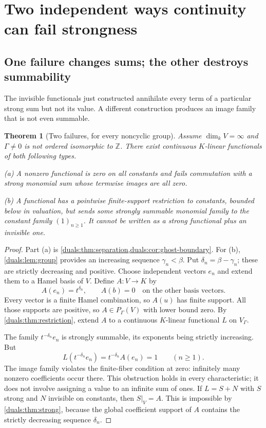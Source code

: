 \documentclass[11pt,letterpaper]{article}
\numberwithin{equation}{section}
\newtheorem{theorem}{Theorem}[section]
\theoremstyle{definition}
\theoremstyle{remark}
\newcommand{\Z}{\mathbb Z}
\begin{document}
\section{Two independent ways continuity can fail strongness}
\label{duals:sec:twofailures}

\subsection{One failure changes sums; the other destroys summability}
The invisible functionals just constructed annihilate every term of a
particular strong sum but not its value. A different construction
produces an image family that is not even summable.

\begin{theorem}[Two failures, for every noncyclic group]
\label{duals:thm:twofailures}
Assume $\dim_kV=\infty$ and $\Gamma\ne0$ is not ordered isomorphic
to $\Z$.
There exist continuous $K$-linear functionals of both following types.

\textup{(a)} A nonzero functional is zero on all constants and fails
commutation with a strong monomial sum whose termwise images are all
zero.

\textup{(b)} A functional has a pointwise finite-support restriction to
constants, bounded below in valuation, but sends some strongly summable
monomial family to the constant family $(1)_{n\ge1}$.
It cannot be written as a strong functional plus an invisible one.
\end{theorem}
\begin{proof}
Part (a) is \cref{duals:thm:separation,duals:cor:ghost-boundary}.
For (b), \cref{duals:lem:group} provides an increasing sequence
$\gamma_n<\beta$. Put $\delta_n=\beta-\gamma_n$; these are strictly
decreasing and positive. Choose independent vectors $e_n$ and extend
them to a Hamel basis of $V$. Define $A:V\to K$ by
\[
 A(e_n)=t^{\delta_n},\qquad A(b)=0
 \quad\text{on the other basis vectors}.
\]
Every vector is a finite Hamel combination, so $A(u)$ has finite
support. All those supports are positive, so $A\in P_\Gamma(V)$
with lower bound zero. By \cref{duals:thm:restriction}, extend $A$ to a
continuous $K$-linear functional $L$ on $V_\Gamma$.

The family $t^{-\delta_n}e_n$ is strongly summable, its exponents being
strictly increasing. But
\[
 L(t^{-\delta_n}e_n)=t^{-\delta_n}A(e_n)=1
 \qquad(n\ge1).
\]
The image family violates the finite-fiber condition at zero:
infinitely many nonzero coefficients occur there. This obstruction holds
in every characteristic; it does not involve assigning a value to an
infinite sum of ones.
If $L=S+N$ with $S$ strong and $N$ invisible on constants, then
$S|_V=A$. This is impossible by \cref{duals:thm:strong}, because the global
coefficient support of $A$ contains the strictly decreasing sequence
$\delta_n$.
\end{proof}
\end{document}
